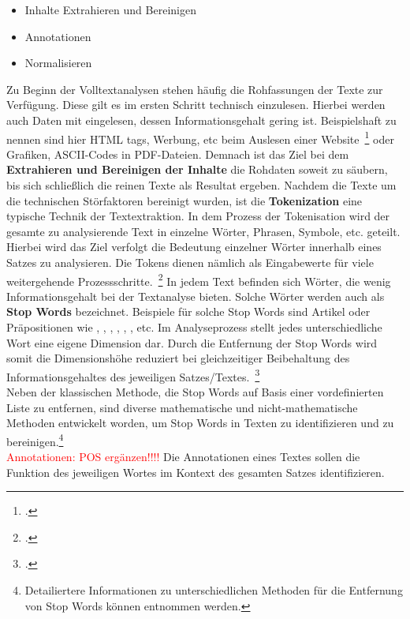 \begin{itemize}
    \item Inhalte Extrahieren und Bereinigen
    \item Annotationen
    \item Normalisieren
\end{itemize}

Zu Beginn der Volltextanalysen stehen häufig die Rohfassungen der Texte zur Verfügung.
Diese gilt es im ersten Schritt technisch einzulesen.
Hierbei werden auch Daten mit eingelesen, dessen Informationsgehalt gering ist.
Beispielshaft zu nennen sind hier HTML tags, Werbung, etc beim Auslesen einer Website~\footcite[\vglf][]
{pahwa.2018} oder Grafiken, ASCII-Codes in PDF-Dateien.
Demnach ist das Ziel bei dem \textbf{Extrahieren und Bereinigen
der Inhalte} die Rohdaten soweit zu säubern, bis sich schließlich die reinen Texte als Resultat ergeben.
Nachdem die Texte um die technischen Störfaktoren bereinigt wurden, ist die \textbf{Tokenization} eine typische Technik
der Textextraktion.
In dem Prozess der Tokenisation wird der gesamte zu analysierende Text in einzelne Wörter, Phrasen,
Symbole, etc.
geteilt.
Hierbei wird das Ziel verfolgt die Bedeutung einzelner Wörter innerhalb eines Satzes zu analysieren.
Die Tokens dienen nämlich als Eingabewerte für viele weitergehende Prozessschritte.~\footcite[\vglf][]
{gurusamy.2014}
In jedem Text befinden sich Wörter, die wenig Informationsgehalt bei der Textanalyse bieten.
Solche Wörter werden auch als \textbf{Stop Words} bezeichnet.
Beispiele für solche Stop Words sind Artikel oder
Präpositionen wie \grqq, \grqq, \grqq, \grqq,
\grqq, \grqq, etc.
Im Analyseprozess stellt jedes unterschiedliche Wort eine eigene Dimension dar.
Durch die Entfernung der Stop Words wird somit die Dimensionshöhe reduziert bei gleichzeitiger Beibehaltung des
Informationsgehaltes des jeweiligen Satzes/Textes.~\footcite[\vglf][]{mohan.2015}\\
Neben der klassischen Methode, die Stop Words auf Basis einer vordefinierten Liste zu entfernen, sind diverse
mathematische und nicht-mathematische Methoden entwickelt worden, um Stop Words in Texten zu identifizieren und zu
bereinigen.\footnote{Detailiertere Informationen zu unterschiedlichen Methoden für die Entfernung von Stop Words
können{}\cite{mohan.2015} entnommen werden.}\\

\textcolor{red}{Annotationen: POS ergänzen!!!!}
Die Annotationen eines Textes sollen die Funktion des jeweiligen Wortes im Kontext des gesamten Satzes identifizieren.
\\


